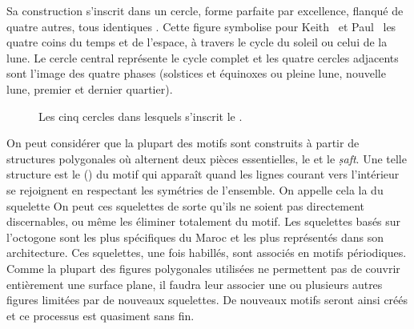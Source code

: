 Sa construction s'inscrit dans un cercle, forme parfaite par 
excellence, flanqué de quatre autres, tous identiques 
. Cette figure symbolise pour Keith~ 
et Paul~ les quatre coins du temps et de l'espace, à 
travers le cycle du soleil ou celui de la lune. Le cercle central 
représente le cycle complet et les quatre cercles adjacents sont 
l'image des quatre phases (solstices et équinoxes ou pleine lune, 
nouvelle lune, premier et dernier quartier).

\begin{figure}[htb]
  \caption{Les cinq cercles dans lesquels s'inscrit le \hatim 
           \autocite{Castera_1996}.{}}
  \label{fig:cercle}
\end{figure}

On peut considérer que la plupart des motifs sont construits à 
partir de structures polygonales où alternent deux pièces 
essentielles, le \hatim et le \emph{\d{s}aft}. Une telle structure 
est le  () du motif qui 
apparaît quand les lignes courant vers l'intérieur se rejoignent 
en respectant les symétries de l'ensemble. On appelle cela la 
 du squelette On peut  ces 
squelettes de sorte qu'ils ne soient pas directement discernables, 
ou même les éliminer totalement du motif. Les squelettes basés sur 
l'octogone sont les plus spécifiques du Maroc et les plus représentés 
dans son architecture. Ces squelettes, une fois habillés, sont 
associés en motifs périodiques. Comme la plupart des figures 
polygonales utilisées ne permettent pas de couvrir entièrement une 
surface plane, il faudra leur associer une ou plusieurs autres figures 
limitées par de nouveaux squelettes. De nouveaux motifs seront ainsi 
créés et ce processus est quasiment sans fin.


